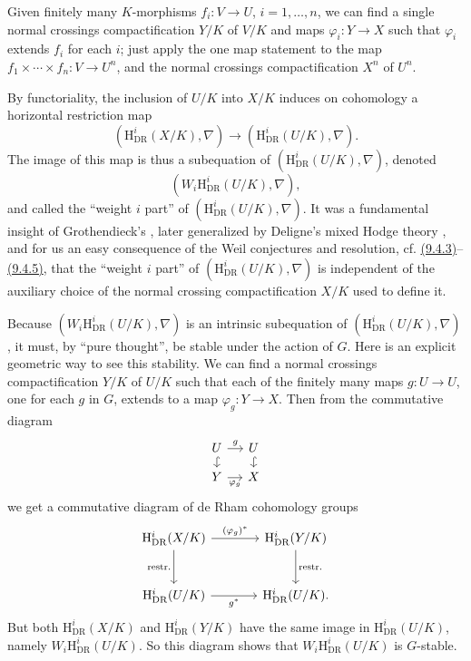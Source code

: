 Given finitely many \(K\)-morphisms \(f_i:V\to U\), \(i=1,\ldots,n\), we can find a single normal crossings compactification \(Y/K\) of \(V/K\) and maps \(\varphi_i:Y\to X\) such that \(\varphi_i\) extends \(f_i\) for each \(i\); just apply the one map statement to the map \(f_1\times\cdots\times f_n:V\to U^n\), and the normal crossings compactification \(X^n\) of \(U^n\).

By functoriality, the inclusion of \(U/K\) into \(X/K\) induces on cohomology a horizontal restriction map
\[
(\mathrm{H}^i_{\mathrm{DR}}(X/K),\nabla)\to(\mathrm{H}^i_{\mathrm{DR}}(U/K),\nabla).
\]
The image of this map is thus a subequation of \((\mathrm{H}^i_{\mathrm{DR}}(U/K),\nabla)\), denoted
\[
(W_i\mathrm{H}^i_{\mathrm{DR}}(U/K),\nabla),
\]
and called the ``weight \(i\) part'' of \((\mathrm{H}^i_{\mathrm{DR}}(U/K),\nabla)\). It was a fundamental insight of Grothendieck's \cite[9.1--4]{Gro-BrauerIII}, later generalized by Deligne's mixed Hodge theory \cite[3.2.17]{De-HodgeII}, and for us an easy consequence of the Weil conjectures and resolution, cf. \hyperref[par:9.4.3]{(9.4.3)}--\hyperref[par:9.4.5]{(9.4.5)}, that the ``weight \(i\) part'' of \((\mathrm{H}^i_{\mathrm{DR}}(U/K),\nabla)\) is independent of the auxiliary choice of the normal crossing compactification \(X/K\) used to define it.

Because \((W_i\mathrm{H}^i_{\mathrm{DR}}(U/K),\nabla)\) is an intrinsic subequation of \((\mathrm{H}^i_{\mathrm{DR}}(U/K),\nabla)\), it must, by ``pure thought'', be stable under the action of \(G\). Here is an explicit geometric way to see this stability. We can find a normal crossings compactification \(Y/K\) of \(U/K\) such that each of the finitely many maps \(g:U\to U\), one for each \(g\) in \(G\), extends to a map \(\varphi_g:Y\to X\). Then from the commutative diagram
\[
\begin{tikzcd}[column sep=small,row sep=small]
U \arrow[r,"g"] \arrow[d,hook] & U \arrow[d,hook]\\
Y \arrow[r,"\varphi_g"'] & X
\end{tikzcd}
\]
we get a commutative diagram of de Rham cohomology groups
\[
\begin{tikzcd}[column sep=large,row sep=large]
\mathrm{H}^i_{\mathrm{DR}}(X/K) \arrow[r,"(\varphi_g)^*"] \arrow[d,"\operatorname{restr.}"'] &
\mathrm{H}^i_{\mathrm{DR}}(Y/K) \arrow[d,"\operatorname{restr.}"]\\
\mathrm{H}^i_{\mathrm{DR}}(U/K) \arrow[r,"g^*"'] &
\mathrm{H}^i_{\mathrm{DR}}(U/K).
\end{tikzcd}
\]
But both \(\mathrm{H}^i_{\mathrm{DR}}(X/K)\) and \(\mathrm{H}^i_{\mathrm{DR}}(Y/K)\) have the same image in \(\mathrm{H}^i_{\mathrm{DR}}(U/K)\), namely \(W_i\mathrm{H}^i_{\mathrm{DR}}(U/K)\). So this diagram shows that \(W_i\mathrm{H}^i_{\mathrm{DR}}(U/K)\) is \(G\)-stable.

